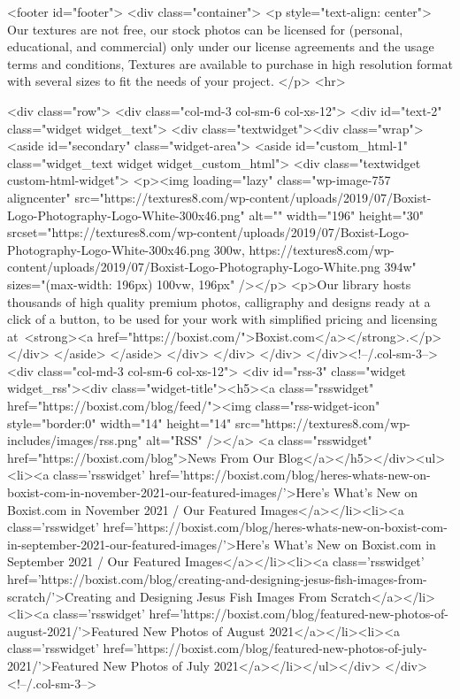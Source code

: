 	<footer id="footer">
		<div class="container">
		    <p style="text-align: center">
Our textures are not free, our stock photos can be licensed for (personal, educational, and commercial) only under our license agreements and the usage terms and conditions, Textures are available to purchase in high resolution format with several sizes to fit the needs of your project.
</p>
<hr>

			<div class="row">
								<div class="col-md-3 col-sm-6 col-xs-12">
					<div id="text-2" class="widget widget_text">			<div class="textwidget"><div class="wrap">
<aside id="secondary" class="widget-area">
<aside id="custom_html-1" class="widget_text widget widget_custom_html">
<div class="textwidget custom-html-widget">
<p><img loading="lazy" class="wp-image-757 aligncenter" src="https://textures8.com/wp-content/uploads/2019/07/Boxist-Logo-Photography-Logo-White-300x46.png" alt="" width="196" height="30" srcset="https://textures8.com/wp-content/uploads/2019/07/Boxist-Logo-Photography-Logo-White-300x46.png 300w, https://textures8.com/wp-content/uploads/2019/07/Boxist-Logo-Photography-Logo-White.png 394w" sizes="(max-width: 196px) 100vw, 196px" /></p>
<p>Our library hosts thousands of high quality premium photos, calligraphy and designs ready at a click of a button, to be used for your work with simplified pricing and licensing at <strong><a href="https://boxist.com/">Boxist.com</a></strong>.</p>
</div>
</aside>
</aside>
</div>
</div>
		</div>				</div><!--/.col-sm-3-->
				<div class="col-md-3 col-sm-6 col-xs-12">
					<div id="rss-3" class="widget widget_rss"><div class="widget-title"><h5><a class="rsswidget" href="https://boxist.com/blog/feed/"><img class="rss-widget-icon" style="border:0" width="14" height="14" src="https://textures8.com/wp-includes/images/rss.png" alt="RSS" /></a> <a class="rsswidget" href="https://boxist.com/blog">News From Our Blog</a></h5></div><ul><li><a class='rsswidget' href='https://boxist.com/blog/heres-whats-new-on-boxist-com-in-november-2021-our-featured-images/'>Here’s What’s New on Boxist.com in November 2021 / Our Featured Images</a></li><li><a class='rsswidget' href='https://boxist.com/blog/heres-whats-new-on-boxist-com-in-september-2021-our-featured-images/'>Here’s What’s New on Boxist.com in September 2021 / Our Featured Images</a></li><li><a class='rsswidget' href='https://boxist.com/blog/creating-and-designing-jesus-fish-images-from-scratch/'>Creating and Designing Jesus Fish Images From Scratch</a></li><li><a class='rsswidget' href='https://boxist.com/blog/featured-new-photos-of-august-2021/'>Featured New Photos of August 2021</a></li><li><a class='rsswidget' href='https://boxist.com/blog/featured-new-photos-of-july-2021/'>Featured New Photos of July 2021</a></li></ul></div>				</div><!--/.col-sm-3-->
